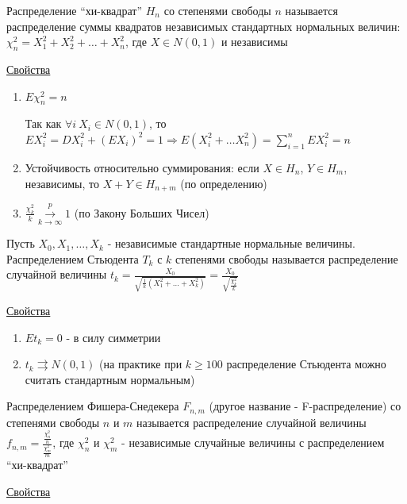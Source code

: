 \documentclass[12pt]{article}
\begin{document}
\begin{enumerate}
    \Def Распределение \enquote{хи-квадрат} $H_n$ со степенями свободы $n$ называется распределение
    суммы квадратов независимых стандартных нормальных величин: $\chi^2_n = X_1^2 + X_2^2 + \dots + X_n^2$, 
    где $X \in N(0, 1)$ и независимы

    \underline{Свойства}

    \begin{enumerate}
        \item $E\chi^2_n = n$

        \begin{MyProof}
            Так как $\forall i \ X_i \in N(0, 1)$, то $E X_i^2 = D X_i^2 + (EX_i)^2 = 1 \Longrightarrow E(X_i^2 + \dots X_n^2) = \sum_{i = 1}^n E X_i^2 = n$
        \end{MyProof}

        \item Устойчивость относительно суммирования: если $X \in H_n$, $Y \in H_m$, независимы, то $X + Y \in H_{n + m}$ (по определению) 


        \item $\frac{\chi_k^2}{k} \overset{p}{\underset{k \to \infty}{\longrightarrow}} 1$ (по Закону Больших Чисел)
    \end{enumerate}

    \Def Пусть $X_0, X_1, \dots, X_k$ - независимые стандартные нормальные величины. 
    Распределением Стьюдента $T_k$ с $k$ степенями свободы называется распределение случайной величины 
    $t_k = \frac{X_0}{\sqrt{\frac{1}{k} (X_1^2 + \dots + X_k^2)}} = \frac{X_0}{\sqrt{\frac{\chi_k^2}{k}}}$

    \underline{Свойства}

    \begin{enumerate}
        \item $Et_k = 0$ - в силу симметрии

        \item $t_k \rightrightarrows N(0, 1)$ (на практике при $k \geq 100$ распределение Стьюдента можно считать стандартным нормальным)
    \end{enumerate}

    \Def Распределением Фишера-Снедекера $F_{n,m}$ (другое название - F-распределение) со степенями свободы $n$ и $m$ называется распределение случайной величины 
    $f_{n,m} = \frac{\frac{\chi^2_n}{n}}{\frac{\chi^2_m}{m}}$, где $\chi_n^2$ и $\chi_m^2$ - независимые случайные величины с распределением \enquote{хи-квадрат}

    \underline{Свойства}


\end{enumerate}
\end{document}
